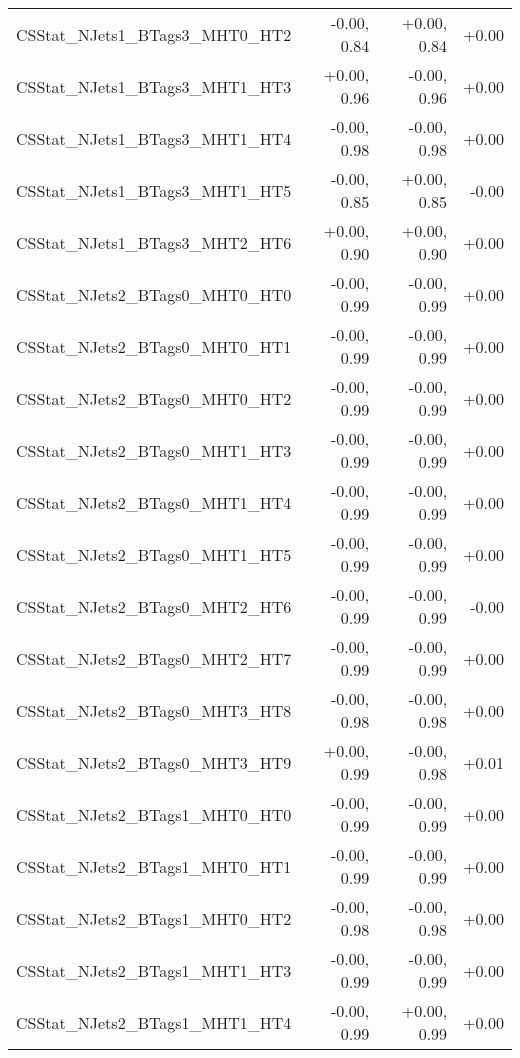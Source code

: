 \begin{tabular}{|l|r|r|r|}
CSStat\_NJets1\_BTags3\_MHT0\_HT2        &      -0.00, 0.84 &     +0.00, 0.84 &  +0.00 \\
CSStat\_NJets1\_BTags3\_MHT1\_HT3        &      +0.00, 0.96 &     -0.00, 0.96 &  +0.00 \\
CSStat\_NJets1\_BTags3\_MHT1\_HT4        &      -0.00, 0.98 &     -0.00, 0.98 &  +0.00 \\
CSStat\_NJets1\_BTags3\_MHT1\_HT5        &      -0.00, 0.85 &     +0.00, 0.85 &  -0.00 \\
CSStat\_NJets1\_BTags3\_MHT2\_HT6        &      +0.00, 0.90 &     +0.00, 0.90 &  +0.00 \\
CSStat\_NJets2\_BTags0\_MHT0\_HT0        &      -0.00, 0.99 &     -0.00, 0.99 &  +0.00 \\
CSStat\_NJets2\_BTags0\_MHT0\_HT1        &      -0.00, 0.99 &     -0.00, 0.99 &  +0.00 \\
CSStat\_NJets2\_BTags0\_MHT0\_HT2        &      -0.00, 0.99 &     -0.00, 0.99 &  +0.00 \\
CSStat\_NJets2\_BTags0\_MHT1\_HT3        &      -0.00, 0.99 &     -0.00, 0.99 &  +0.00 \\
CSStat\_NJets2\_BTags0\_MHT1\_HT4        &      -0.00, 0.99 &     -0.00, 0.99 &  +0.00 \\
CSStat\_NJets2\_BTags0\_MHT1\_HT5        &      -0.00, 0.99 &     -0.00, 0.99 &  +0.00 \\
CSStat\_NJets2\_BTags0\_MHT2\_HT6        &      -0.00, 0.99 &     -0.00, 0.99 &  -0.00 \\
CSStat\_NJets2\_BTags0\_MHT2\_HT7        &      -0.00, 0.99 &     -0.00, 0.99 &  +0.00 \\
CSStat\_NJets2\_BTags0\_MHT3\_HT8        &      -0.00, 0.98 &     -0.00, 0.98 &  +0.00 \\
CSStat\_NJets2\_BTags0\_MHT3\_HT9        &      +0.00, 0.99 &     -0.00, 0.98 &  +0.01 \\
CSStat\_NJets2\_BTags1\_MHT0\_HT0        &      -0.00, 0.99 &     -0.00, 0.99 &  +0.00 \\
CSStat\_NJets2\_BTags1\_MHT0\_HT1        &      -0.00, 0.99 &     -0.00, 0.99 &  +0.00 \\
CSStat\_NJets2\_BTags1\_MHT0\_HT2        &      -0.00, 0.98 &     -0.00, 0.98 &  +0.00 \\
CSStat\_NJets2\_BTags1\_MHT1\_HT3        &      -0.00, 0.99 &     -0.00, 0.99 &  +0.00 \\
CSStat\_NJets2\_BTags1\_MHT1\_HT4        &      -0.00, 0.99 &     +0.00, 0.99 &  +0.00 \\

\end{tabular}
